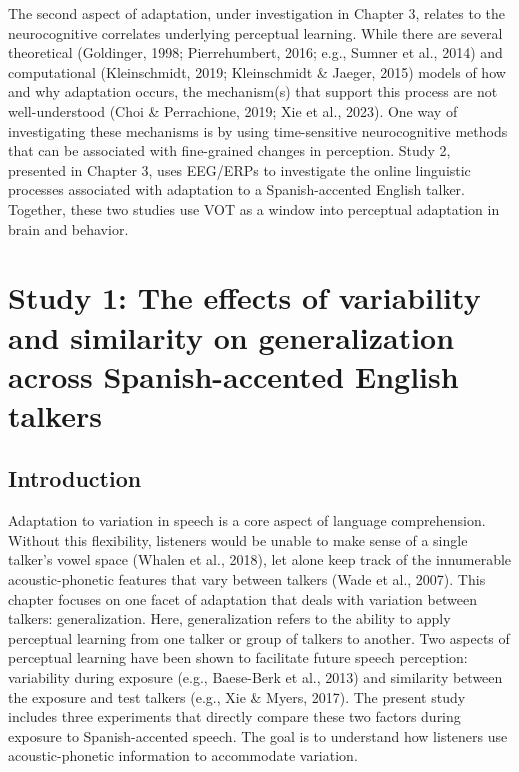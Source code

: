 \documentclass[
  12pt,
  twoside]{article}
\begin{document}
The second aspect of adaptation, under investigation in Chapter 3, relates to the neurocognitive correlates underlying perceptual learning.
While there are several theoretical (Goldinger, 1998; Pierrehumbert, 2016; e.g., Sumner et al., 2014) and computational (Kleinschmidt, 2019; Kleinschmidt \& Jaeger, 2015) models of how and why adaptation occurs, the mechanism(s) that support this process are not well-understood (Choi \& Perrachione, 2019; Xie et al., 2023).
One way of investigating these mechanisms is by using time-sensitive neurocognitive methods that can be associated with fine-grained changes in perception.
Study 2, presented in Chapter 3, uses EEG/ERPs to investigate the online linguistic processes associated with adaptation to a Spanish-accented English talker.
Together, these two studies use VOT as a window into perceptual adaptation in brain and behavior.

\newpage

\hypertarget{study-1-the-effects-of-variability-and-similarity-on-generalization-across-spanish-accented-english-talkers}{%
\section{Study 1: The effects of variability and similarity on generalization across Spanish-accented English talkers}\label{study-1-the-effects-of-variability-and-similarity-on-generalization-across-spanish-accented-english-talkers}}

\hypertarget{introduction}{%
\subsection{Introduction}\label{introduction}}

Adaptation to variation in speech is a core aspect of language comprehension.
Without this flexibility, listeners would be unable to make sense of a single talker's vowel space (Whalen et al., 2018), let alone keep track of the innumerable acoustic-phonetic features that vary between talkers (Wade et al., 2007).
This chapter focuses on one facet of adaptation that deals with variation between talkers: generalization.
Here, generalization refers to the ability to apply perceptual learning from one talker or group of talkers to another.
Two aspects of perceptual learning have been shown to facilitate future speech perception: variability during exposure (e.g., Baese-Berk et al., 2013) and similarity between the exposure and test talkers (e.g., Xie \& Myers, 2017).
The present study includes three experiments that directly compare these two factors during exposure to Spanish-accented speech.
The goal is to understand how listeners use acoustic-phonetic information to accommodate variation.
\end{document}
